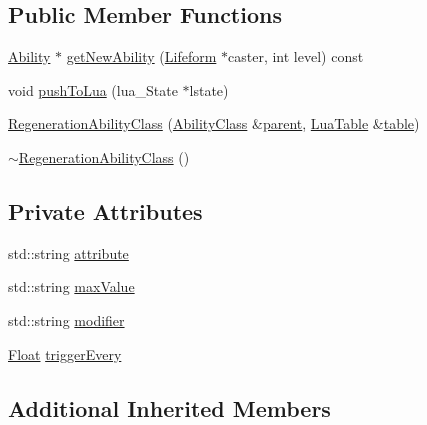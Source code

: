 \subsection*{Public Member Functions}
\begin{DoxyCompactItemize}
\item 
\hyperlink{classZeta_1_1Ability}{Ability} $\ast$ \hyperlink{classZeta_1_1RegenerationAbilityClass_ab238cfad5341977c2033a1cb0593fa87}{get\+New\+Ability} (\hyperlink{classZeta_1_1Lifeform}{Lifeform} $\ast$caster, int level) const 
\item 
void \hyperlink{classZeta_1_1RegenerationAbilityClass_a13af8e7c56d7532c0aa48788ab943d78}{push\+To\+Lua} (lua\+\_\+\+State $\ast$lstate)
\item 
\hyperlink{classZeta_1_1RegenerationAbilityClass_a08b64672e0fa42298a8d9740c7832694}{Regeneration\+Ability\+Class} (\hyperlink{classZeta_1_1AbilityClass}{Ability\+Class} \&\hyperlink{classZeta_1_1AbilityClass_ad862e9ba14d23afb20786a1eeb2ca872}{parent}, \hyperlink{classZeta_1_1LuaTable}{Lua\+Table} \&\hyperlink{classZeta_1_1AbilityClass_a58065ca9d19ff9366c09bfc8d81abbac}{table})
\item 
\hyperlink{classZeta_1_1RegenerationAbilityClass_a47e3f9fc19bd721ceca74702b4512db3}{$\sim$\+Regeneration\+Ability\+Class} ()
\end{DoxyCompactItemize}
\subsection*{Private Attributes}
\begin{DoxyCompactItemize}
\item 
std\+::string \hyperlink{classZeta_1_1RegenerationAbilityClass_a71b59a691f2408177894f1f84d14e121}{attribute}
\item 
std\+::string \hyperlink{classZeta_1_1RegenerationAbilityClass_a845194fe275b7911aff30ee70c0aeb02}{max\+Value}
\item 
std\+::string \hyperlink{classZeta_1_1RegenerationAbilityClass_a0e836c289e8d4631ca995fe3d5223671}{modifier}
\item 
\hyperlink{namespaceZeta_a1e0a1265f9b3bd3075fb0fabd39088ba}{Float} \hyperlink{classZeta_1_1RegenerationAbilityClass_a0f0ae20d7223b9a9bf20e3d20500f653}{trigger\+Every}
\end{DoxyCompactItemize}
\subsection*{Additional Inherited Members}



